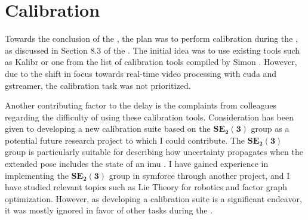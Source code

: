 \section{Calibration}
Towards the conclusion of the \preproject, the plan was to perform calibration during the \master, as discussed in Section 8.3 of the \preproject.
The initial idea was to use existing tools such as Kalibr or one from the list of calibration tools compiled by Simon \cite{EthzaslKalibr2023}\cite{simonCameraCalibTools2023}.
However, due to the shift in focus towards real-time video processing with \gls{cuda} and \gls{gstreamer}, the calibration task was not prioritized.

Another contributing factor to the delay is the complaints from colleagues regarding the difficulty of using these calibration tools.
Consideration has been given to developing a new calibration suite based on the $\mathbf{SE_2(3)}$ group as a potential future research project to which I could contribute.
The $\mathbf{SE_2(3)}$ group is particularly suitable for describing how uncertainty propagates when the extended pose includes the state of an \gls{imu} \cite{barfootAssociatingUncertaintyThreeDimensional2014}.
I have gained experience in implementing the $\mathbf{SE_2(3)}$ group in \gls{symforce} through another project, and I have studied relevant topics such as Lie Theory for robotics and factor graph optimization.
However, as developing a calibration suite is a significant endeavor, it was mostly ignored in favor of other tasks during the \master.